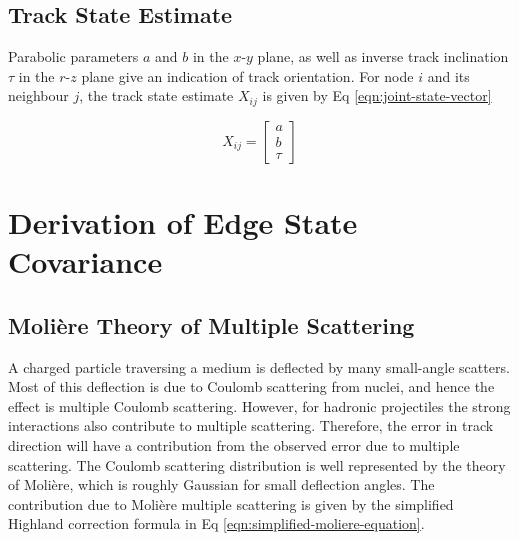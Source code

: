 \subsection{Track State Estimate}

Parabolic parameters $a$ and $b$ in the $x$-$y$ plane, as well as inverse track inclination $\tau$ in the $r$-$z$ plane give an indication of track orientation. For node $i$ and its neighbour $j$, the track state estimate $X_{ij}$ is given by Eq \eqref{eqn:joint-state-vector}

\begin{equation}
X_{ij} = \begin{bmatrix} a \\ b \\ \tau \end{bmatrix}
\label{eqn:joint-state-vector}
\end{equation}






\section{Derivation of Edge State Covariance}
\label{chapter-6-covariance-derivation}

\subsection{Moli\`ere Theory of Multiple Scattering}

A charged particle traversing a medium is deflected by many small-angle scatters. Most of this deflection is due to Coulomb scattering from nuclei, and hence the effect is multiple Coulomb scattering. However, for hadronic projectiles the strong interactions also contribute to multiple scattering. Therefore, the error in track direction will have a contribution from the observed error due to multiple scattering. The Coulomb scattering distribution is well represented by the theory of Moli\`ere, which is roughly Gaussian for small deflection angles. The contribution due to Moli\`ere multiple scattering is given by the simplified Highland correction formula \cite{moliere-theory-formula} in Eq \eqref{eqn:simplified-moliere-equation}.



